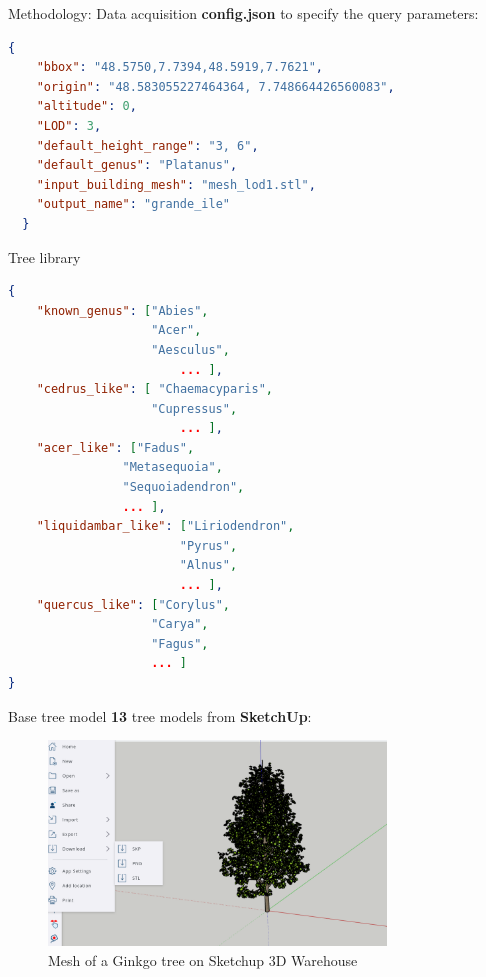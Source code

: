 \documentclass[12pt]{beamer}
\begin{document}
\begin{frame}[fragile]{Methodology: Data acquisition}
  \textbf{config.json} to specify the query parameters:
  \begin{lstlisting}[language=json]
  {
    "bbox": "48.5750,7.7394,48.5919,7.7621",
    "origin": "48.583055227464364, 7.748664426560083",
    "altitude": 0,
    "LOD": 3,
    "default_height_range": "3, 6",
    "default_genus": "Platanus",
    "input_building_mesh": "mesh_lod1.stl",
    "output_name": "grande_ile"
  }
  \end{lstlisting}
\end{frame}

\begin{frame}[fragile]{Tree library}
\begin{lstlisting}[language=json]
{
    "known_genus": ["Abies",
                    "Acer",
                    "Aesculus",
                        ... ],
    "cedrus_like": [ "Chaemacyparis",
                    "Cupressus",
                        ... ],
    "acer_like": ["Fadus",
                "Metasequoia",
                "Sequoiadendron",
                ... ],
    "liquidambar_like": ["Liriodendron",
                        "Pyrus",
                        "Alnus",
                        ... ],
    "quercus_like": ["Corylus",
                    "Carya",
                    "Fagus",
                    ... ]
}
\end{lstlisting}
\end{frame}

\begin{frame}{Base tree model}
\textbf{13} tree models from \textbf{SketchUp}:

\begin{figure}[H]
    \centering
        \centering
        \includegraphics[width=0.8\textwidth]{images/ginkgo_sketchup.png}
        \caption{Mesh of a Ginkgo tree on Sketchup 3D Warehouse}
\end{figure}
\end{frame}
\end{document}

